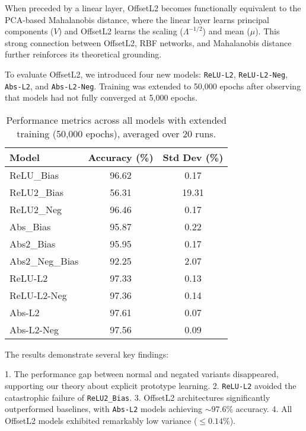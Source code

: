 When preceded by a linear layer, OffsetL2 becomes functionally equivalent to the PCA-based Mahalanobis distance, where the linear layer learns principal components ($V$) and OffsetL2 learns the scaling ($\Lambda^{-1/2}$) and mean ($\mu$). This strong connection between OffsetL2, RBF networks, and Mahalanobis distance further reinforces its theoretical grounding.

To evaluate OffsetL2, we introduced four new models: \texttt{ReLU-L2}, \texttt{ReLU-L2-Neg}, \texttt{Abs-L2}, and \texttt{Abs-L2-Neg}. Training was extended to 50,000 epochs after observing that models had not fully converged at 5,000 epochs.


\begin{table}[H]
    \centering
    \begin{tabular}{lcc}
    \toprule
    \textbf{Model} & \textbf{Accuracy (\%)} & \textbf{Std Dev (\%)} \\
    \midrule
    ReLU\_Bias & 96.62 & 0.17 \\
    ReLU2\_Bias & 56.31 & 19.31 \\
    ReLU2\_Neg & 96.46 & 0.17 \\
    Abs\_Bias & 95.87 & 0.22 \\
    Abs2\_Bias & 95.95 & 0.17 \\
    Abs2\_Neg\_Bias & 92.25 & 2.07 \\
    \midrule
    ReLU-L2 & 97.33 & 0.13 \\
    ReLU-L2-Neg & 97.36 & 0.14 \\
    Abs-L2 & 97.61 & 0.07 \\
    Abs-L2-Neg & 97.56 & 0.09 \\
    \bottomrule
    \end{tabular}
    \caption{Performance metrics across all models with extended training (50,000 epochs), averaged over 20 runs.}
    \label{tab:extended_training}
\end{table}

The results demonstrate several key findings:

1. The performance gap between normal and negated variants disappeared, supporting our theory about explicit prototype learning.
2. \texttt{ReLU-L2} avoided the catastrophic failure of \texttt{ReLU2\_Bias}.
3. OffsetL2 architectures significantly outperformed baselines, with \texttt{Abs-L2} models achieving $\sim 97.6\%$ accuracy.
4. All OffsetL2 models exhibited remarkably low variance ($\leq 0.14\%$).


